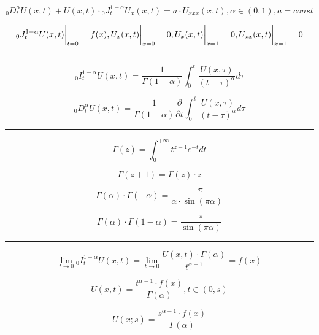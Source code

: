 \documentclass[12pt, a4paper]{article}
\newcommand {\partt} {\frac{\partial}{\partial t}}
\begin{document}
	\begin{equation}
	{}_{0}D_{t}^{\alpha}U(x,t) + U(x,t)\cdot {}_{0}J^{1-\alpha}_{t}U_{x}(x,t)=a \cdot U_{xxx}(x,t), \alpha \in (0, 1), a = const
	\end{equation}
	
	\begin{equation}
	{}_{0}J^{1-\alpha}_{t}U(x,t) \bigg{|}_{t=0} = f(x), U_{x}(x,t) \bigg{|}_{x=0}=0, U_{x}(x,t) \bigg{|}_{x=1}=0, U_{xx}(x,t) \bigg{|}_{x=1}=0
	\end{equation}
	
\noindent\rule{\linewidth}{0.4pt}
	\begin{equation}
	{}_{0}I_{t}^{1-\alpha} U(x,t) = \frac{1}{\Gamma(1-\alpha)} \int_{0}^{t} \frac{U(x,\tau)}{(t-\tau)^{\alpha}}d\tau
	\end{equation}
	
	\begin{equation}
	{}_{0}D_{t}^{\alpha} U(x,t) = \frac{1}{\Gamma(1-\alpha)} \partt \int_{0}^{t} \frac{U(x,\tau)}{(t-\tau)^{\alpha}}d\tau
	\end{equation}
	
\noindent\rule{\linewidth}{0.4pt}
	\begin{equation}
	\Gamma(z)=\int_{0}^{+\infty}t^{z-1} e^{-t} dt
	\end{equation}
	
	\begin{equation}
	\Gamma(z+1)=\Gamma(z)\cdot z
	\end{equation}
	
	\begin{equation}
	\Gamma(\alpha)\cdot \Gamma(-\alpha) = \frac{- \pi}{\alpha \cdot \sin(\pi \alpha)}
	\end{equation}
	
	\begin{equation}
	\Gamma(\alpha)\cdot \Gamma(1-\alpha) = \frac{\pi}{\sin(\pi \alpha)}
	\end{equation}
	
\noindent\rule{\linewidth}{0.4pt}
	\begin{equation}
	\lim_{t \to 0} {}_{0}I_{t}^{1-\alpha} U(x,t) = \lim_{t \to 0}\frac{U(x,t)\cdot \Gamma(\alpha)}{t^{\alpha-1}} = f(x)
	\end{equation}
	
	\begin{equation}
	U(x,t) = \frac{t^{\alpha-1} \cdot f(x)}{\Gamma(\alpha)}, t \in (0,s)
	\end{equation}
	
	\begin{equation}
	U(x;s) = \frac{s^{\alpha-1} \cdot f(x)}{\Gamma(\alpha)}
	\end{equation}
\end{document}
